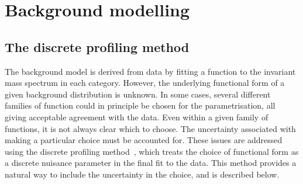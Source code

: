 
\section{Background modelling}
\label{model:sec:background_model}
\subsection{The discrete profiling method}
\label{model:sec:background_model_envelope}

The background model is derived from data by fitting a function to the invariant mass spectrum in each category. However, the underlying functional form of a given background distribution is unknown. In some cases, several different families of function could in principle be chosen for the parametrisation, all giving acceptable agreement with the data. Even within a given family of functions, it is not always clear which to choose. The uncertainty associated with making a particular choice must be accounted for. %
These issues are addressed using the discrete profiling method~\cite{DiscreteProfiling}, which treats the choice of functional form as a discrete nuisance parameter in the final \NLL fit to the data. This method provides a natural way to include the uncertainty in the choice, and is described below.

